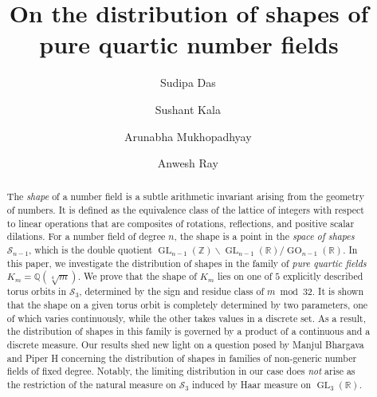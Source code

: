 \documentclass[table]{amsart}
\newcommand{\op}[1]{\operatorname{#1}}
\numberwithin{equation}{section}
\begin{document}
\title[Shapes of pure quartic number fields]{On the distribution of shapes of pure quartic number fields}

\author[S.~Das]{Sudipa Das\, }
\address[Das]{Department of Mathematics, Harish-Chandra Research Institute, A CI of Homi Bhabha National Institute, Chhatnag Rd, Jhusi, Prayagraj, Uttar Pradesh 211019, India}

\author[S.~Kala]{Sushant Kala\, }
\address[Kala]{Chennai Mathematical Institute, H1, SIPCOT IT Park, Kelambakkam, Siruseri, Tamil Nadu 603103, India}


\author[A.~Mukhopadhyay]{Arunabha Mukhopadhyay\, }
\address[Mukhopadhyay]{Department of Mathematics, Institute of Mathematical Sciences (HBNI), CIT Campus, IV Cross
Road, Chennai, India-600113}

\author[A.~Ray]{Anwesh Ray\, }
\address[Ray]{Chennai Mathematical Institute, H1, SIPCOT IT Park, Kelambakkam, Siruseri, Tamil Nadu 603103, India}




\maketitle

\begin{abstract}
The \emph{shape} of a number field is a subtle arithmetic invariant arising from the geometry of numbers. It is defined as the equivalence class of the lattice of integers with respect to linear operations that are composites of rotations, reflections, and positive scalar dilations. For a number field of degree $n$, the shape is a point in the \emph{space of shapes} $\mathcal{S}_{n-1}$, which is the double quotient $\op{GL}_{n-1}(\mathbb{Z}) \backslash \op{GL}_{n-1}(\mathbb{R}) / \op{GO}_{n-1}(\mathbb{R})$. In this paper, we investigate the distribution of shapes in the family of \emph{pure quartic fields} $K_m = \mathbb{Q}(\sqrt[4]{m})$. We prove that the shape of $K_m$ lies on one of $5$ explicitly described torus orbits in $\mathcal{S}_3$, determined by the sign and residue class of $m \bmod 32$. It is shown that the shape on a given torus orbit is completely determined by two parameters, one of which varies continuously, while the other takes values in a discrete set. As a result, the distribution of shapes in this family is governed by a product of a continuous and a discrete measure. Our results shed new light on a question posed by Manjul Bhargava and Piper H concerning the distribution of shapes in families of non-generic number fields of fixed degree. Notably, the limiting distribution in our case does \emph{not} arise as the restriction of the natural measure on $\mathcal{S}_3$ induced by Haar measure on $\op{GL}_3(\mathbb{R})$.
\end{abstract}
\end{document}
